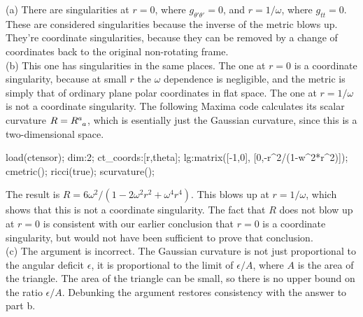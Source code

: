 
(a) There are singularities at $r=0$, where $g_{\theta'\theta'}=0$, and $r=1/\omega$,
where $g_{tt}=0$. These are considered singularities because the inverse of the metric
blows up. They're coordinate singularities, because they can be removed by a change of
coordinates back to the original non-rotating frame.\\
(b) This one has singularities in
the same places. The one at $r=0$ is a coordinate singularity, because at small $r$
the $\omega$ dependence is negligible, and the metric is simply that of ordinary
plane polar coordinates in flat space. The one at $r=1/\omega$ is not a coordinate
singularity. The following Maxima code calculates its scalar curvature $R=R\indices{^a_a}$,
which is esentially just the Gaussian curvature, since this is a two-dimensional space.
\begin{listing}{1}
load(ctensor);
dim:2;
ct_coords:[r,theta];
lg:matrix([-1,0],
          [0,-r^2/(1-w^2*r^2)]);
cmetric();   
ricci(true);
scurvature();
\end{listing}
The result is $R=6\omega^2/(1-2\omega^2r^2+\omega^4r^4)$.
This blows up at $r=1/\omega$, which shows that this is not a coordinate
singularity. The fact that $R$ does not blow up at $r=0$ is consistent with our
earlier conclusion that $r=0$ is a coordinate singularity, but would not have been
sufficient to prove that conclusion.\\
(c) The argument is incorrect. The Gaussian curvature is not just proportional to
the angular deficit $\epsilon$, it is proportional to the
limit of $\epsilon/A$, where $A$ is the area of the triangle. The area of the triangle
can be small, so there is no upper bound on the ratio $\epsilon/A$.
Debunking the argument restores consistency with the answer to part b.
